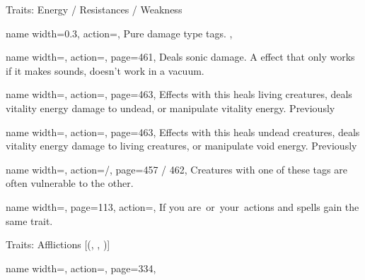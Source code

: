 \begin{PageFront}
\begin{Tables}{\frontTableHeight}
\begin{Table}{Traits: Energy / Resistances / Weakness}
            \begin{entry}{}{%
                name width=0.3,%
                action=\stackbox[l][c]{\Acid\Cold\Electricity\Fire\Force}, }
                Pure damage type tags. ,
            \end{entry}
            \begin{entry}{}{%
                name width=\conditionLength,%
                action=\Sonic,
                page=461,
            }
                Deals sonic damage.
                A effect that only works if it makes sounds, doesn't work in a vacuum. \hfill
            \end{entry}
            \begin{entry}{}{%
                name width=\conditionLength,%
                action=\Vitality,
                page=463,
            }
                Effects with this heals living creatures, deals vitality energy damage to undead, or manipulate vitality energy.\hfill
                Previously \Positive
            \end{entry}
            \begin{entry}{}{%
                name width=\conditionLength,%
                action=\Void,
                page=463,
            }
                Effects with this heals undead creatures, deals vitality energy damage to living creatures, or manipulate void energy. \hfill
                Previously \Negative
            \end{entry}
            \begin{entry}{}{%
                name width=\conditionLength,%
                action=\Holy /\Unholy,
                page=457 / 462,
            }
                Creatures with one of these tags are often vulnerable to the other.
            \end{entry}
            \begin{entry}{}{%
                name width=\conditionLength,%
                page=113,
                action=\Sanctified,
            }
                If you are \Holy\,or \Unholy\,your \Sanctified\,actions and spells gain the same trait.
            \end{entry}
        \end{Table}
        \TableSpace
        \begin{Table}{Traits: Afflictions }[{(, , )}]
            \begin{entry}{}{%
                name width=\conditionLength,%
                action=\Virulent,
                page=334,
            }

\end{entry}
\end{Table}
\end{Tables}
\end{PageFront}

